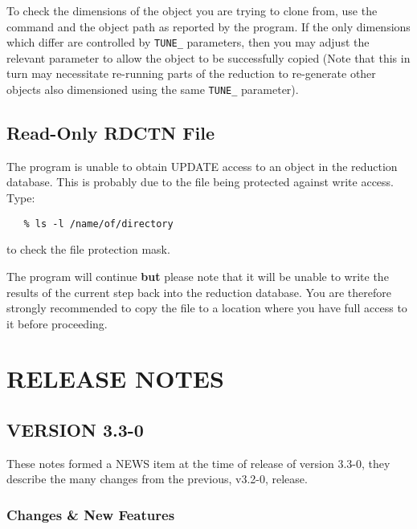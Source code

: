 To check the dimensions of the object you are trying to clone from, use
the   command and the object
path as reported by the program.  If the only dimensions which differ are
controlled by \verb+TUNE_+ parameters,
then you may adjust the relevant parameter to allow the object
to be successfully copied (Note that this in turn may necessitate
re-running parts of the reduction to re-generate other objects also
dimensioned using the same \verb+TUNE_+ parameter).

\subsection{ Read-Only RDCTN File}

The program is unable to obtain UPDATE access to an object in the
reduction database.  This is probably due to the file being
protected against write access. Type:

\begin{verbatim}
   % ls -l /name/of/directory
\end{verbatim}

to check the file protection mask.

The program will continue {\bf but} please note that it will be unable to
write the results of the current step back into the reduction database.
You are therefore strongly recommended to copy the file to a location
where you have full access to it before proceeding.


\newpage
\section{RELEASE NOTES}

\subsection{VERSION 3.3-0}

These notes formed a NEWS item at the time of release of version 3.3-0,
they describe the many changes from the previous, v3.2-0, release.

\subsubsection{Changes \& New Features}

